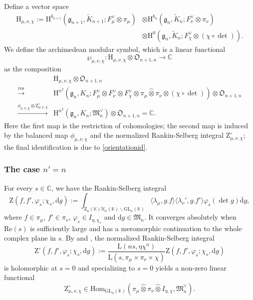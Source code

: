 \documentclass[12pt, a4paper]{amsart}
\newcommand{\RH}{{\mathrm {H}}}
\newcommand{\RL}{{\mathrm {L}}}
\newcommand{\RN}{{\mathrm {N}}}
\newcommand{\RZ}{{\mathrm {Z}}}
\newcommand{\GL}{{\mathrm{GL}}}
\newcommand{\C}{\mathbb{C}}
\newcommand{\K}{\mathbb{K}}
\theoremstyle{Theorem}
\theoremstyle{Theorem}
\theoremstyle{Theorem}
\theoremstyle{Theorem}
\theoremstyle{Plain}
\theoremstyle{Definition}
\begin{document}
	
	Define a vector space
	\[
	\begin{aligned}
		\RH_{\mu,\nu,\chi}:=\RH^{b_{n+1}}\left(\mathfrak{g}_{n+1},\widetilde{K}_{n+1};F_{\mu}^{\vee}\otimes\pi_{\mu}\right)&\otimes\RH^{b_{n}}\left(\mathfrak{g}_{n},\widetilde{K}_{n};F_{\nu}^{\vee}\otimes\pi_{\nu}\right)\\
		&\otimes\RH^0\left(\mathfrak{g}_{n},\widetilde{K}_{n};F_{\chi}^{\vee}\otimes(\chi\circ\det)\right).
	\end{aligned}
	\]
	We define the archimedean modular symbol, which is a linear functional
	\[
	\wp_{\mu,\nu,\chi}:\RH_{\mu,\nu,\chi}\otimes\mathfrak{O}_{n+1,n}\to\C
	\]
	as the composition
	\[
	\begin{aligned}
		&\RH_{\mu,\nu,\chi}\otimes\mathfrak{O}_{n+1,n}\\
		\xrightarrow{\mathrm{res}}	& \RH^{n^2}\left(\mathfrak{g}_{n},K_{n};F_{\mu}^{\vee}\otimes F_{\nu}^{\vee}\otimes F_{\chi}^{\vee}\otimes\pi_{\mu}\widehat{\otimes}\pi_{\nu}\otimes(\chi\circ\det)\right)\otimes\mathfrak{O}_{n+1,n}\\
		\xrightarrow{\phi_{\mu,\nu,\chi}\otimes\RZ_{\mu,\nu,\chi}^{\circ}}&\RH^{n^2}\left(\mathfrak{g}_{n},K_{n};\mathfrak{M}_{n}^{\vee}\right)\otimes\mathfrak{O}_{n+1,n}=\C.
	\end{aligned}
	\]
	Here the first map is the restriction of cohomologies; the second map is induced by the balanced map $\phi_{\mu,\nu,\chi}$ and the normalized Rankin-Selberg integral $\RZ_{\mu,\nu,\chi}^{\circ}$; the final identification is due to \eqref{orientationid}.
	
	\subsubsection{The case $n'=n$}
	
	For every $s\in\C$, we have the Rankin-Selberg integral
	\[
	\RZ(f,f',\varphi_s;\chi_s,\mathrm{d}g):=\int_{\RZ_n(\K)\RN_{n}(\K)\backslash\GL_{n}(\K)}\langle\lambda_{\mu},g.f\rangle\langle\lambda_{\nu}',g.f'\rangle\varphi_s(\det g)\overline{\mathrm{d}}g,
	\]
	where $f\in\pi_{\mu}$, $f'\in\pi_{\nu}$, $\varphi_s\in I_{\eta,\chi_s}$ and $\mathrm{d}g\in\mathfrak{M}_{n}$. It converges absolutely when $\mathrm{Re}(s)$ is sufficiently large and has a meromorphic continuation to the whole complex plane in $s$. By \cite{J09} and \cite[Propsition 3.2]{JLSa}, the normalized Rankin-Selberg integral
	\[
	\RZ^{\circ}(f,f',\varphi_s;\chi_s,\mathrm{d}g):=\frac{\RL(ns,\eta\chi^n)}{\RL(s,\pi_{\mu}\times\pi_{\nu}\times\chi)}\RZ(f,f',\varphi_s;\chi_s,\mathrm{d}g)
	\]
	is holomorphic at $s=0$ and specializing to $s=0$ yields a non-zero linear functional
	\[
	\RZ_{\mu,\nu,\chi}^{\circ}\in\mathrm{Hom}_{\GL_{n}(\K)}\left(\pi_{\mu}\widehat{\otimes}\pi_{\nu}\widehat{\otimes}I_{\eta,\chi},\mathfrak{M}_n^{\vee}\right).
	\]
	
\end{document}
